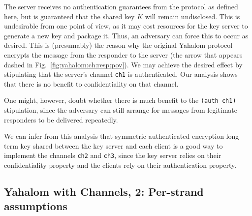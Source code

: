 The server receives no authentication guarantees from the protocol as
defined here, but is guaranteed that the shared key $K$ will remain
undisclosed.  This is undesirable from one point of view, as it may
cost resources for the key server to generate a new key and package
it.  Thus, an adversary can force this to occur as desired.  This is
(presumably) the reason why the original Yahalom protocol encrypts the
message from the responder to the server (the arrow that appears
dashed in Fig.~\ref{fig:yahalom:ch:resp:pov}).  We may achieve the
desired effect by stipulating that the server's channel \verb|ch1| is
authenticated.  Our analysis shows that there is no benefit to
confidentiality on that channel.

One might, however, doubt whether there is much benefit to the
\texttt{(auth ch1)} stipulation, since the adversary can still arrange
for messages from legitimate responders to be delivered repeatedly.

We can infer from this analysis that symmetric authenticated
encryption long term key shared between the key server and each client
is a good way to implement the channels \verb|ch2| and \verb|ch3|,
since the key server relies on their confidentiality property and the
clients rely on their authentication property.  


\subsection{Yahalom with Channels, 2:  Per-strand assumptions}
\label{sec:channels:state:ch:strand:level}

